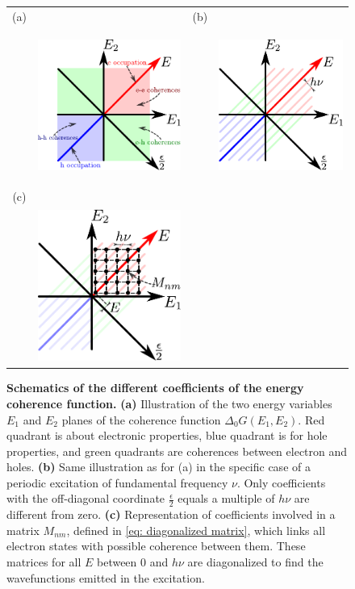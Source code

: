 \begin{figure}[hptb]
	\begin{center}
		\begin{tabular}{c c c c}
			(a) & & (b) & \\
			
			& \includegraphics[height = 5cm]{./chap1/schema_Glauber}&
			& \includegraphics[height = 5cm]{./chap1/schema_Glauber_periodique}\\
			(c) &  & & \\ 
			& \includegraphics[height = 5cm]{./chap1/schema_Glauber_matrice}& &
		\end{tabular} 
	\end{center}
	\caption{\textbf{Schematics of the different coefficients of the energy coherence function.} \textbf{(a)} Illustration of the two energy variables $E_{1}$ and $E_{2}$ planes of the coherence function $\Delta_{0}G\left(E_{1},E_{2}\right)$. Red quadrant is about electronic properties, blue quadrant is for hole properties, and green quadrants are coherences between electron and holes. \textbf{(b)} Same illustration as for (a) in the specific case of a periodic excitation of fundamental frequency $\nu$. Only coefficients with the off-diagonal coordinate $\frac{\epsilon}{2}$ equals a multiple of $h\nu$ are different from zero. \textbf{(c)} Representation of coefficients involved in a matrix $M_{nm}$, defined in \eqref{eq: diagonalized matrix}, which links all electron states with possible coherence between them. These matrices for all $E$ between $0$ and $h\nu$ are diagonalized to find the wavefunctions emitted in the excitation.}
	\label{fig: schema Glauber}
\end{figure}


